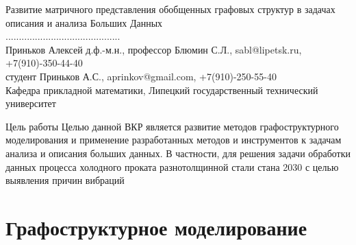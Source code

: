 \documentclass{beamer}
\begin{document}
\begin{darkframes}
\begin{frame}
			\centering
				Развитие матричного представления обобщенных графовых структур в задачах описания и анализа Больших Данных\\
				...........................................
			\\Приньков Алексей
					\vfill
			\centering  
				д.ф.-м.н., профессор Блюмин С.Л., sabl@lipetsk.ru, +7(910)-350-44-40
				\\студент Приньков А.С., aprinkov@gmail.com, +7(910)-250-55-40
				\\\vspace{0.1cm}\tiny{Кафедра прикладной математики, Липецкий государственный технический университет}
	\end{frame}
		\begin{frame}{}
			\begin{block}{Цель работы}
			\centering
				Целью данной ВКР является развитие методов графоструктурного моделирования и применение разработанных методов и инструментов к задачам анализа и описания больших данных. В частности, для решения задачи обработки данных процесса холодного проката разнотолщинной стали стана 2030 с целью выявления причин вибраций
			\end{block}
		\end{frame}
		\section{Графоструктурное моделирование}

\end{darkframes}
\end{document}
